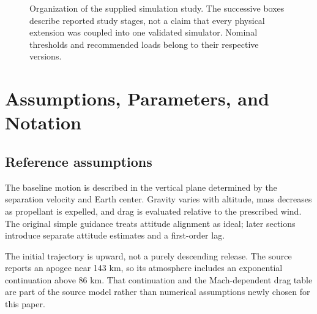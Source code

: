 \documentclass[11pt,a4paper]{article}
\begin{document}
\begin{figure}[htbp]
\centering
{}
\caption{Organization of the supplied simulation study. The successive boxes describe reported study stages, not a claim that every physical extension was coupled into one validated simulator. Nominal thresholds and recommended loads belong to their respective versions.}
\label{fig:workflow}
\end{figure}

\section{Assumptions, Parameters, and Notation}
\subsection{Reference assumptions}
The baseline motion is described in the vertical plane determined by the separation velocity and Earth center. Gravity varies with altitude, mass decreases as propellant is expelled, and drag is evaluated relative to the prescribed wind. The original simple guidance treats attitude alignment as ideal; later sections introduce separate attitude estimates and a first-order lag.

The initial trajectory is upward, not a purely descending release. The source reports an apogee near 143 km, so its atmosphere includes an exponential continuation above 86 km. That continuation and the Mach-dependent drag table are part of the source model rather than numerical assumptions newly chosen for this paper.
\end{document}
